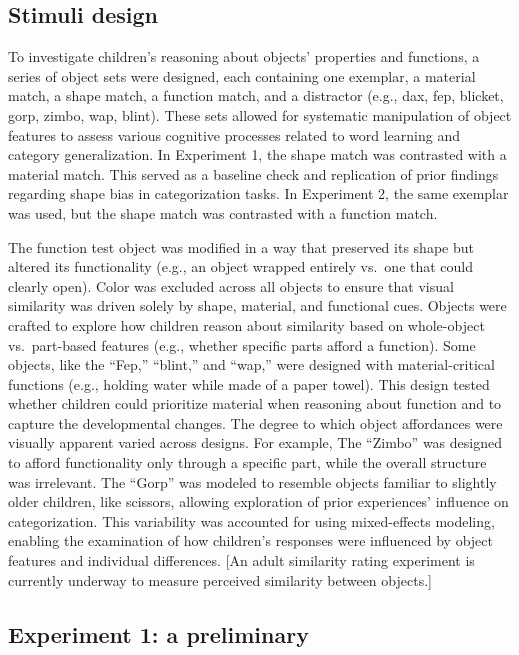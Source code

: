 \documentclass[10pt, letterpaper]{article}
\begin{document}
\hypertarget{stimuli-design}{%
\subsection{Stimuli design}\label{stimuli-design}}

To investigate children's reasoning about objects' properties and
functions, a series of object sets were designed, each containing one
exemplar, a material match, a shape match, a function match, and a
distractor (e.g., dax, fep, blicket, gorp, zimbo, wap, blint). These
sets allowed for systematic manipulation of object features to assess
various cognitive processes related to word learning and category
generalization. In Experiment 1, the shape match was contrasted with a
material match. This served as a baseline check and replication of prior
findings regarding shape bias in categorization tasks. In Experiment 2,
the same exemplar was used, but the shape match was contrasted with a
function match.

The function test object was modified in a way that preserved its shape
but altered its functionality (e.g., an object wrapped entirely vs.~one
that could clearly open). Color was excluded across all objects to
ensure that visual similarity was driven solely by shape, material, and
functional cues. Objects were crafted to explore how children reason
about similarity based on whole-object vs.~part-based features (e.g.,
whether specific parts afford a function). Some objects, like the
``Fep,'' ``blint,'' and ``wap,'' were designed with material-critical
functions (e.g., holding water while made of a paper towel). This design
tested whether children could prioritize material when reasoning about
function and to capture the developmental changes. The degree to which
object affordances were visually apparent varied across designs. For
example, The ``Zimbo'' was designed to afford functionality only through
a specific part, while the overall structure was irrelevant. The
``Gorp'' was modeled to resemble objects familiar to slightly older
children, like scissors, allowing exploration of prior experiences'
influence on categorization. This variability was accounted for using
mixed-effects modeling, enabling the examination of how children's
responses were influenced by object features and individual differences.
{[}An adult similarity rating experiment is currently underway to
measure perceived similarity between objects.{]}

\hypertarget{experiment-1-a-preliminary}{%
\subsection{Experiment 1: a
preliminary}\label{experiment-1-a-preliminary}}
\end{document}
